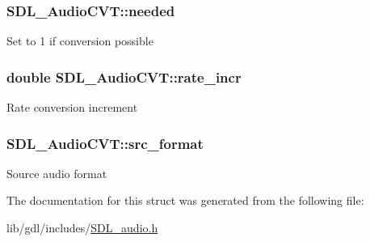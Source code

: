 \subsubsection[{needed}]{ S\+D\+L\+\_\+\+Audio\+C\+V\+T\+::needed}\label{struct_s_d_l___audio_c_v_t_ac600a035a48df05e14d3712fd6953ad4}
Set to 1 if conversion possible \hypertarget{struct_s_d_l___audio_c_v_t_ad886122c23a6673073baace31bff3b6c}{}
\subsubsection[{rate\+\_\+incr}]{\setlength{\rightskip}{0pt plus 5cm}double S\+D\+L\+\_\+\+Audio\+C\+V\+T\+::rate\+\_\+incr}\label{struct_s_d_l___audio_c_v_t_ad886122c23a6673073baace31bff3b6c}
Rate conversion increment \hypertarget{struct_s_d_l___audio_c_v_t_a6ae81231e017105e6d5e745a51732e16}{}
\subsubsection[{src\+\_\+format}]{ S\+D\+L\+\_\+\+Audio\+C\+V\+T\+::src\+\_\+format}\label{struct_s_d_l___audio_c_v_t_a6ae81231e017105e6d5e745a51732e16}
Source audio format 

The documentation for this struct was generated from the following file\+:\begin{DoxyCompactItemize}
\item 
lib/gdl/includes/\hyperlink{_s_d_l__audio_8h}{S\+D\+L\+\_\+audio.\+h}\end{DoxyCompactItemize}
